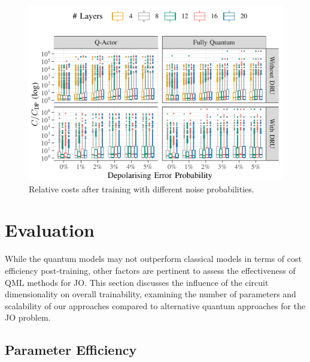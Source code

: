 \documentclass[10pt, conference]{IEEEtran}
\begin{document}
\begin{figure}[htbp]
  \includegraphics{img-gen/noisy_validation.pdf}\vspace*{-0.5em}
  \caption{Relative costs after training with different noise probabilities.}
  \label{fig:noisy-validation}
\end{figure}

\section{Evaluation}
\label{sec:discussion}

While the quantum models may not outperform classical models in terms of cost efficiency post-training, other factors are pertinent to assess the effectiveness of QML methods for JO.
This section discusses the influence of the circuit dimensionality on overall trainability, examining the number of parameters and scalability of our approaches compared to alternative quantum approaches for the JO problem.

\subsection{Parameter Efficiency}
\end{document}
